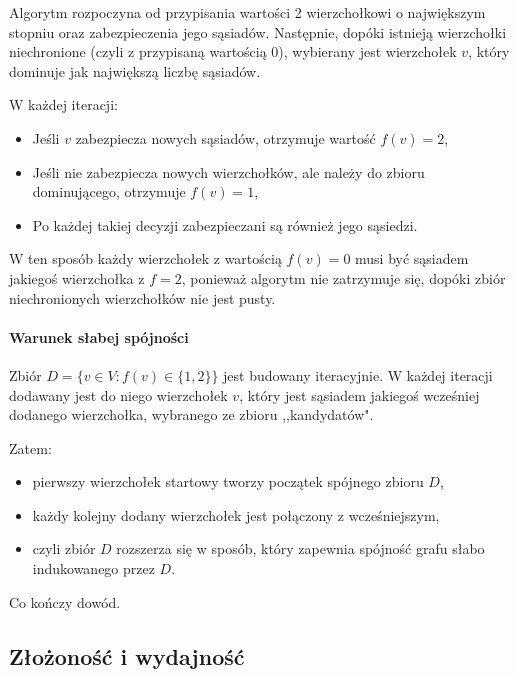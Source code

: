     Algorytm rozpoczyna od przypisania wartości 2 wierzchołkowi o największym stopniu oraz zabezpieczenia jego sąsiadów. Następnie, dopóki istnieją wierzchołki niechronione (czyli z przypisaną wartością 0), wybierany jest wierzchołek $v$, który dominuje jak największą liczbę sąsiadów.

    W każdej iteracji:
    \begin{itemize}
        \item Jeśli $v$ zabezpiecza nowych sąsiadów, otrzymuje wartość $f(v) = 2$,
        \item Jeśli nie zabezpiecza nowych wierzchołków, ale należy do zbioru dominującego, otrzymuje $f(v) = 1$,
        \item Po każdej takiej decyzji zabezpieczani są również jego sąsiedzi.
    \end{itemize}

    W ten sposób każdy wierzchołek z wartością $f(v) = 0$ musi być sąsiadem jakiegoś wierzchołka z $f = 2$, ponieważ algorytm nie zatrzymuje się, dopóki zbiór niechronionych wierzchołków nie jest pusty.

    \paragraph{Warunek słabej spójności}

    Zbiór $D = \{v \in V : f(v) \in \{1,2\} \}$ jest budowany iteracyjnie. W każdej iteracji dodawany jest do niego wierzchołek $v$, który jest sąsiadem jakiegoś wcześniej dodanego wierzchołka, wybranego ze zbioru ,,kandydatów".

    Zatem:
    \begin{itemize}
        \item pierwszy wierzchołek startowy tworzy początek spójnego zbioru $D$,
        \item każdy kolejny dodany wierzchołek jest połączony z wcześniejszym,
        \item czyli zbiór $D$ rozszerza się w sposób, który zapewnia spójność grafu słabo indukowanego przez $D$.
    \end{itemize}
    Co kończy dowód.

    
    \subsection{Złożoność i wydajność}

